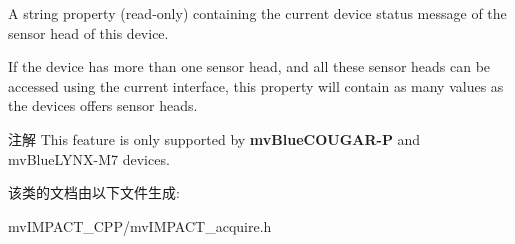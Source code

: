 A string property {\bfseries }(read-\/only) containing the current device status message of the sensor head of this device. 

If the device has more than one sensor head, and all these sensor heads can be accessed using the current interface, this property will contain as many values as the devices offers sensor heads.

\begin{DoxyNote}{注解}
This feature is only supported by {\bfseries mv\+Blue\+C\+O\+U\+G\+A\+R-\/\+P} and mv\+Blue\+L\+Y\+N\+X-\/\+M7 devices. 
\end{DoxyNote}


该类的文档由以下文件生成\+:\begin{DoxyCompactItemize}
\item 
mv\+I\+M\+P\+A\+C\+T\+\_\+\+C\+P\+P/mv\+I\+M\+P\+A\+C\+T\+\_\+acquire.\+h\end{DoxyCompactItemize}
